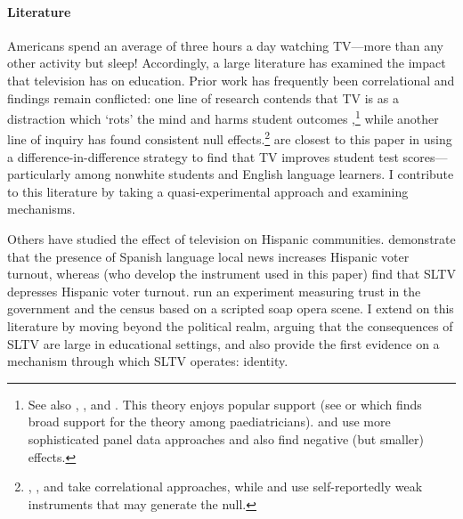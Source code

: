 \documentclass[11pt]{article}
\begin{document}
\paragraph{Literature} Americans spend an average of three hours a day watching TV---more than any other activity but sleep! Accordingly, a large literature has examined the impact that television has on education. Prior work has frequently been correlational and findings remain conflicted: one line of research contends that TV is as a distraction which `rots' the mind and harms student outcomes \citep{zavodny_does_2006},\footnote{ See also \cite{aksoy2000panel}, \cite{hornik1981out}, and \cite{keith1986parental}. This theory enjoys popular support (see \cite{winn_plug-drug_2002} or \cite{gentile_well-child_2004} which finds broad support for the theory among paediatricians). \cite{huang2010dynamic} and \cite{nakamuro2015television} use more sophisticated panel data approaches and also find negative (but smaller) effects.} while another line of inquiry has found consistent null effects.\footnote{ \cite{gaddy1986television}, \cite{gortmaker1990impact}, and \cite{hu2020relationship} take correlational approaches, while \cite{munasib2010idiot} and \cite{kureishi2013does} use self-reportedly weak instruments that may generate the null.}  \cite{gentzkow_preschool_2008} are closest to this paper in using a difference-in-difference strategy to find that TV improves student test scores---particularly among nonwhite students and English language learners. I contribute to this literature by taking a quasi-experimental approach and examining mechanisms. 

Others have studied the effect of television on Hispanic communities. \cite{oberholzer-gee_media_2009} demonstrate that the presence of Spanish language local news increases Hispanic voter turnout, whereas  \cite{velez_tuning_2019} (who develop the instrument used in this paper) find that SLTV depresses Hispanic voter turnout. \cite{trujillo_devil_2012} run an experiment measuring trust in the government and the census based on a scripted soap opera scene. I extend on this literature by moving beyond the political realm, arguing that the consequences of SLTV are large in educational settings, and also provide the first evidence on a mechanism through which SLTV operates: identity.
\end{document}
